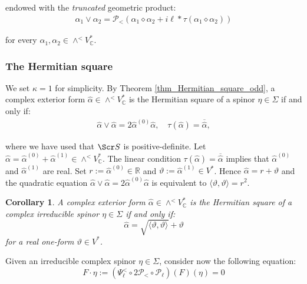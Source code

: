 \documentclass[10pt,a4paper,twoside,reqno]{amsart}
\theoremstyle{plain}
\newtheorem{cor}[thm]{Corollary}
\theoremstyle{definition}
\theoremstyle{remark}
\def\C{\mathbb{C}}
\def\R{\mathbb{R}}
\def\scS{\Scr S}
\def\cP{\mathcal{P}}
\def\cP{\mathcal{P}}
\def\R{\mathbb{R}}
\newcommand{\escal}[1]{\langle#1\rangle}
\begin{document}
\noindent
endowed with the \emph{truncated} geometric product:
\begin{eqnarray*}
\alpha_1\vee\alpha_2=\cP_<(\alpha_1\diamond\alpha_2+i\ell*\tau(\alpha_1\diamond\alpha_2))  
\end{eqnarray*}

\noindent
for every $\alpha_1,\alpha_2\in\wedge^<V^*_\C$.


\subsubsection{The Hermitian square}


We set $\kappa=1$ for simplicity. By Theorem \ref{thm_Hermitian_square_odd}, a complex exterior form $\widehat{\alpha}\in\wedge^<V^*_\C$ is the Hermitian square of a spinor $\eta \in\Sigma$ if and only if: 
\begin{eqnarray*}
\widehat{\alpha}\vee\widehat{\alpha}=2\widehat{\alpha}^{(0)}\widehat{\alpha},\quad \tau(\widehat{\alpha})=\overline{\widehat{\alpha}},
\end{eqnarray*}

\noindent
where we have used that $\scS$ is positive-definite. Let $\widehat{\alpha}=\widehat{\alpha}^{(0)}+\widehat{\alpha}^{(1)}\in\wedge^<V^*_\C$. The linear condition $\tau(\widehat{\alpha})=\overline{\widehat{\alpha}}$ implies that $\widehat{\alpha}^{(0)}$ and $\widehat{\alpha}^{(1)}$ are real. Set $r:=\widehat{\alpha}^{(0)}\in\R$ and $\vartheta:=\widehat{\alpha}^{(1)}\in V^*$. Hence $\widehat{\alpha}=r+\vartheta$ and the quadratic equation $\widehat{\alpha}\vee\widehat{\alpha}=2\widehat{\alpha}^{(0)}\widehat{\alpha}$ is equivalent to $\escal{\vartheta,\vartheta}=r^2$.

\begin{cor}
A complex exterior form $\widehat{\alpha}\in\wedge^<V^*_\C$ is the Hermitian square of a complex irreducible spinor $\eta\in\Sigma$ if and only if: $$\textstyle \widehat{\alpha}=\sqrt{\escal{\vartheta,\vartheta}}+\vartheta$$ for a real one-form $\vartheta\in V^*$.
\end{cor}

Given an irreducible complex spinor $\eta\in \Sigma$, consider now the following equation:
\begin{equation*}
F\cdot\eta:=(\Psi_{\ell}^< \circ 2\cP_{<} \circ \cP_{\ell})(F)(\eta)=0
\end{equation*}
\end{document}
